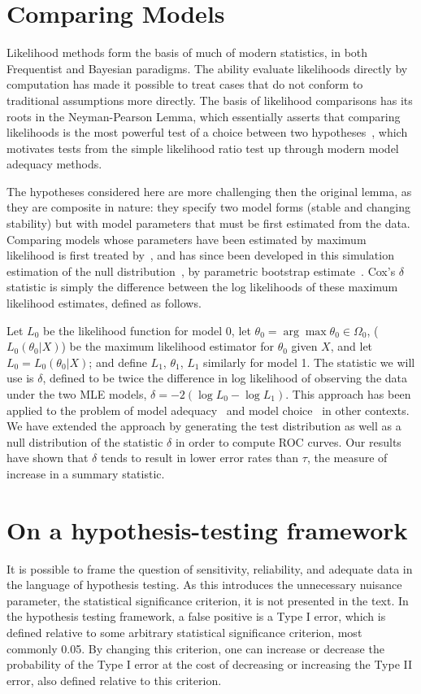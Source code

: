 \documentclass[11pt]{elsarticle}
\begin{document}
\section{Comparing Models}\label{Cox}
Likelihood methods form the basis of much of modern statistics, in both Frequentist and Bayesian paradigms.  
The ability evaluate likelihoods directly by computation has made it possible to treat cases that do not conform to traditional assumptions more directly.
The basis of likelihood comparisons has its roots in the Neyman-Pearson Lemma, 
which essentially asserts that comparing likelihoods is the most powerful test
of a choice between two hypotheses~\citep{Neyman1933}, which motivates
tests from the simple likelihood ratio test up through modern model adequacy methods.

The hypotheses considered here are more challenging then the original lemma, as they are composite in nature:
they specify two model forms (stable and changing stability)
but with model parameters that must be first estimated from the data.
Comparing models whose parameters have been estimated by maximum likelihood is first treated by~\citet{Cox1961, Cox1962},
and has since been developed in this simulation estimation of the null distribution~\citep{McLachlan1987}, by parametric bootstrap estimate~\citep{Efron1987}.  
Cox's $\delta$ statistic is simply the difference between the log likelihoods of these maximum likelihood estimates, defined as follows.

Let $L_0$ be the likelihood function for model 0, 
let $\theta_0 = \arg \max \theta_0 \in \Omega_0$, ($L_0 (\theta_0 |X)$) 
be the maximum likelihood estimator for $\theta_0$ given $X$, and let $L_0 = L_0 (\theta_0 |X)$; 
and define $L_1$, $\theta_1$, $L_1$ similarly for model 1. 
The statistic we will use is $\delta$, 
defined to be twice the difference in log likelihood of observing the data under the two MLE models,
$\delta = -2 (\log L_0 - \log L_1 )$.  
This approach has been applied to the problem of model adequacy~\citep{Goldman1993} and model choice~\citep{Huelsenbeck1996} in other contexts.  
We have extended the approach by generating the test distribution as well as a null distribution of the statistic $\delta$ in order to compute ROC curves.  
Our results have shown that $\delta$ tends to result in lower error rates than $\tau$, the measure of increase in a summary statistic.  


\pagebreak

\section{On a hypothesis-testing framework}\label{Dakos}
It is possible to frame the question of sensitivity, reliability, and adequate data in the language of hypothesis testing. As this introduces the unnecessary nuisance parameter, the statistical significance criterion, it is not presented in the text.  In the hypothesis testing framework, a false positive is a Type I error, which is defined relative to some arbitrary statistical significance criterion, most commonly 0.05.  By changing this criterion, one can increase or decrease the probability of the Type I error at the cost of decreasing or increasing the Type II error, also defined relative to this criterion.  
\end{document}
